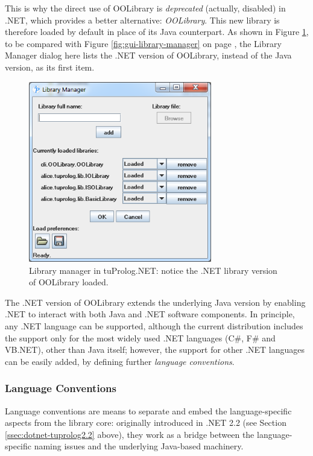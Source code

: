 This is why the direct use of OOLibrary is \textit{deprecated} (actually, disabled) in \tuprolog{}.NET, which provides a better alternative: \textit{OOLibrary}. This new library is therefore loaded by default in place of its Java counterpart. As shown in Figure \ref{fig:dotnet-oolibrary}, to be compared with Figure \ref{fig:gui-library-manager} on page \pageref{fig:gui-library-manager}, the Library Manager dialog here lists the .NET version of OOLibrary, instead of the Java version, as its first item.

\begin{figure}
\centering
  \includegraphics[width=8cm]{images/dotnet-oolibrary}
  \caption{Library manager in tuProlog.NET: notice the .NET library version of OOLibrary loaded.}\label{fig:dotnet-oolibrary}
\end{figure}

The .NET version of OOLibrary extends the underlying Java version by enabling \tuprolog{}.NET to interact with both Java and .NET software components. In principle, any .NET language can be supported, although the current distribution includes the support only for the most widely used .NET languages (C\#, F\# and VB.NET), other than Java itself; however, the support for other .NET languages can be easily added, by defining further \textit{language conventions}.

\subsubsection{Language Conventions}

Language conventions are \tuprolog{} means to separate and embed the language-specific aspects from the library core: originally introduced in \tuprolog{}.NET 2.2 (see Section \ref{ssec:dotnet-tuprolog2.2} above), they work as a bridge between the language-specific naming issues and the underlying Java-based machinery.

